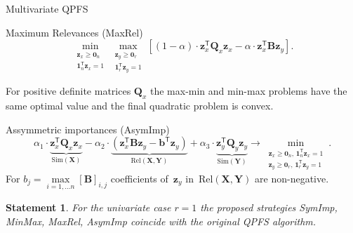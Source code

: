 \documentclass[9pt]{beamer}
\newcommand{\bz}{\mathbf{z}}
\newcommand{\bb}{\mathbf{b}}
\newcommand{\bY}{\mathbf{Y}}
\newcommand{\bX}{\mathbf{X}}
\newcommand{\bB}{\mathbf{B}}
\newcommand{\bQ}{\mathbf{Q}}
\newcommand{\bOne}{\boldsymbol{1}}
\newcommand{\bZero}{\boldsymbol{0}}
\newcommand{\T}{\mathsf{T}}
\newtheorem{statement}{Statement}
\begin{document}
\begin{frame}{Multivariate QPFS}
\begin{block}{Maximum Relevances (MaxRel)}
\[
\min_{\substack{\bz_x \geq \bZero_n \\ \bOne_n^{\T}\bz_x=1}} 	\max_{\substack{\bz_y \geq \bZero_r \\ \bOne_r^{\T}\bz_y=1}} \left[ (1 - \alpha) \cdot \bz_x^{\T} \bQ_x \bz_x - \alpha \cdot \bz_x^{\T} \bB \bz_y \right].
\]
\end{block}
\begin{theorem}[Isachenko, 2018]
	For positive definite matrices $\bQ_x$ the max-min and min-max problems have the same optimal value and the final quadratic problem is convex. 
\end{theorem}
\begin{block}{Assymmetric importances (AsymImp)}
\begin{equation*}
	\alpha_1 \cdot \underbrace{\bz_x^{\T} \bQ_x \bz_x}_{\text{Sim}(\bX)} - \alpha_2 \cdot  \underbrace{\left(\bz_x^{\T} \bB \bz_y - \bb^{\T} \bz_y \right) }_{\text{Rel}(\bX, \bY)} + \alpha_3 \cdot \underbrace{\bz_y^{\T} \bQ_y \bz_y}_{\text{Sim}(\bY)} \rightarrow \min_{\substack{\bz_x \geq \bZero_n, \, \bOne_n^{\T}\bz_x=1 \\ \bz_y \geq \bZero_r, \, \bOne_r^{\T}\bz_y=1}}.
\end{equation*}
For $b_j = \max\limits_{i=1, \dots n} [\bB]_{i, j}$ coefficients of~$\bz_y$ in~$\text{Rel}(\bX, \bY)$ are non-negative.

\begin{statement}
	For the univariate case $r=1$ the proposed strategies SymImp, MinMax, MaxRel, AsymImp coincide with the original QPFS algorithm.
\end{statement}
\end{block}
\end{frame}
\end{document}
